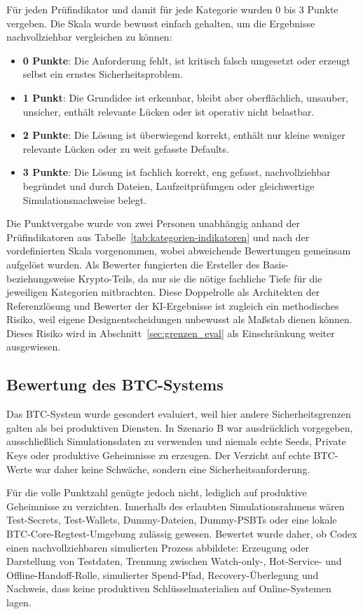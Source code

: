 Für jeden Prüfindikator und damit für jede Kategorie wurden 0 bis 3 Punkte vergeben. Die Skala wurde bewusst einfach gehalten, um die Ergebnisse nachvollziehbar vergleichen zu können:

\begin{itemize}
\item \textbf{0 Punkte}: Die Anforderung fehlt, ist kritisch falsch umgesetzt oder erzeugt selbst ein ernstes Sicherheitsproblem.
\item \textbf{1 Punkt}: Die Grundidee ist erkennbar, bleibt aber oberflächlich, unsauber, unsicher, enthält relevante Lücken oder ist operativ nicht belastbar.
\item \textbf{2 Punkte}: Die Lösung ist überwiegend korrekt, enthält nur kleine weniger relevante Lücken oder zu weit gefasste Defaults.
\item \textbf{3 Punkte}: Die Lösung ist fachlich korrekt, eng gefasst, nachvollziehbar begründet und durch Dateien, Laufzeitprüfungen oder gleichwertige Simulationsnachweise belegt.
\end{itemize}

Die Punktvergabe wurde von zwei Personen unabhängig anhand der Prüfindikatoren aus Tabelle~\ref{tab:kategorien-indikatoren} und nach der vordefinierten Skala vorgenommen, wobei abweichende Bewertungen gemeinsam aufgelöst wurden. 
Als Bewerter fungierten die Ersteller des Basis- beziehungsweise Krypto-Teils, da nur sie die nötige fachliche Tiefe für die jeweiligen Kategorien mitbrachten. 
Diese Doppelrolle als Architekten der Referenzlösung und Bewerter der \ac{KI}-Ergebnisse ist zugleich ein methodisches Risiko, weil eigene Designentscheidungen unbewusst als Maßstab dienen können.
Dieses Risiko wird in Abschnitt~\ref{sec:grenzen_eval} als Einschränkung weiter ausgewiesen.

\subsection{Bewertung des \ac{BTC}-Systems} \label{subsec:btc-bewertung}

Das \ac{BTC}-System wurde gesondert evaluiert, weil hier andere Sicherheitsgrenzen galten als bei produktiven Diensten. In Szenario B war ausdrücklich vorgegeben, ausschließlich Simulationsdaten zu verwenden und niemals echte Seeds, Private Keys oder produktive Geheimnisse zu erzeugen. Der Verzicht auf echte \ac{BTC}-Werte war daher keine Schwäche, sondern eine Sicherheitsanforderung.

Für die volle Punktzahl genügte jedoch nicht, lediglich auf produktive Geheimnisse zu verzichten. Innerhalb des erlaubten Simulationsrahmens wären Test-Secrets, Test-Wallets, Dummy-Dateien, Dummy-PSBTs oder eine lokale \ac{BTC}-Core-Regtest-Umgebung zulässig gewesen. Bewertet wurde daher, ob Codex einen nachvollziehbaren simulierten Prozess abbildete: Erzeugung oder Darstellung von Testdaten, Trennung zwischen Watch-only-, Hot-Service- und Offline-Handoff-Rolle, simulierter Spend-Pfad, Recovery-Überlegung und Nachweis, dass keine produktiven Schlüsselmaterialien auf Online-Systemen lagen.

